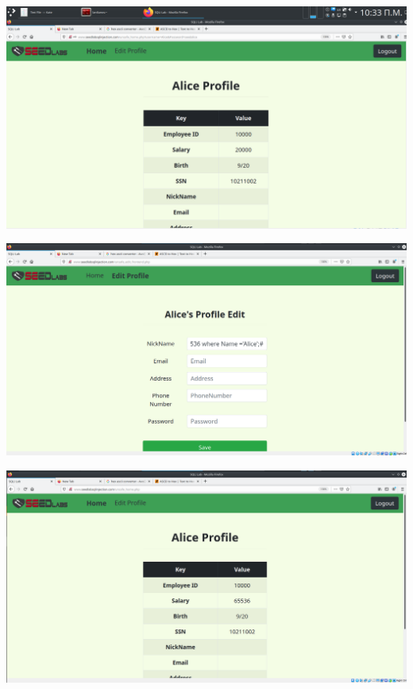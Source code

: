 \begin{center}
			\includegraphics[width=1\textwidth]{image/3.1.1.PNG}		
\end{center}
\begin{center}
			\includegraphics[width=1\textwidth]{image/3.1.2.PNG}		
\end{center}
\begin{center}
			\includegraphics[width=1\textwidth]{image/3.1.3.PNG}		
\end{center}

